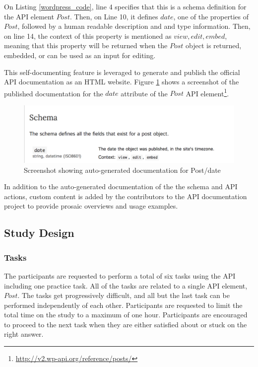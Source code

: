 \documentclass[conference]{IEEEtran}
\begin{document}
On Listing \ref{wordpress_code}, line 4 specifies that this is a schema definition for the API element $Post$. Then, on Line 10, it defines $date$, one of the properties of $Post$, followed by a human readable description and and type information. Then, on line 14, the context of this property is mentioned as $view, edit, embed$, meaning that this property will be returned when the $Post$ object is returned, embedded, or can be used as an input for editing.

This self-documenting feature is leveraged to generate and publish the official API documentation as an HTML website. Figure \ref{fig:schema} shows a screenshot of the published documentation for the $date$ attribute of the $Post$ API element\footnote{\url{http://v2.wp-api.org/reference/posts/}}.

\begin{figure}[h!]
\begin{center}
\includegraphics[width=\linewidth,keepaspectratio]{schema.png}
\end{center}
\caption{Screenshot showing auto-generated documentation for Post/date}
\label{fig:schema}
\end{figure}

In addition to the auto-generated documentation of the the schema and API actions, custom content is added by the contributors to the API documentation project to provide prosaic overviews and usage examples.



\subsection{Study Design} %
\subsubsection{Tasks} %

The participants are requested to perform a total of six tasks using the API including one practice task. All of the tasks are related to a single API element, $Post$. The tasks get progressively difficult, and all but the last task can be performed independently of each other. Participants are requested to limit the total time on the study to a maximum of one hour. Participants are encouraged to proceed to the next task when they are either satisfied about or stuck on the right answer.
\end{document}
